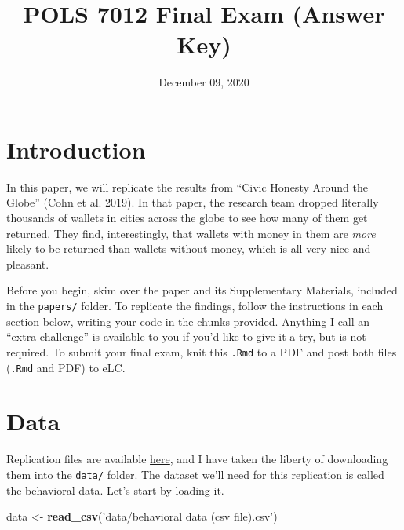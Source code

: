 \documentclass[12pt,halfline,a4paper,]{ouparticle}
\newenvironment{Shaded}{\begin{snugshade}}{\end{snugshade}}
\newcommand{\KeywordTok}[1]{\textcolor[rgb]{0.13,0.29,0.53}{\textbf{#1}}}
\newcommand{\NormalTok}[1]{#1}
\newcommand{\StringTok}[1]{\textcolor[rgb]{0.31,0.60,0.02}{#1}}
\begin{document}
\title{POLS 7012 Final Exam (Answer Key)}

\author{%
\address{University of Georgia}
\and
{}\address{University of Georgia}
}

\abstract{}

\date{December 09, 2020}

\keywords{}

\maketitle



\hypertarget{introduction}{%
\section{Introduction}\label{introduction}}

In this paper, we will replicate the results from ``Civic Honesty Around
the Globe'' (Cohn et al. 2019). In that paper, the research team dropped
literally thousands of wallets in cities across the globe to see how
many of them get returned. They find, interestingly, that wallets with
money in them are \emph{more} likely to be returned than wallets without
money, which is all very nice and pleasant.

Before you begin, skim over the paper and its Supplementary Materials,
included in the \texttt{papers/} folder. To replicate the findings,
follow the instructions in each section below, writing your code in the
chunks provided. Anything I call an ``extra challenge'' is available to
you if you'd like to give it a try, but is not required. To submit your
final exam, knit this \texttt{.Rmd} to a PDF and post both files
(\texttt{.Rmd} and PDF) to eLC.

\hypertarget{data}{%
\section{Data}\label{data}}

Replication files are available
\href{https://dataverse.harvard.edu/dataverse/honesty}{here}, and I have
taken the liberty of downloading them into the \texttt{data/} folder.
The dataset we'll need for this replication is called the behavioral
data. Let's start by loading it.

\begin{Shaded}
\begin{Highlighting}[]
\NormalTok{data <-}\StringTok{ }\KeywordTok{read_csv}\NormalTok{(}\StringTok{'data/behavioral data (csv file).csv'}\NormalTok{)}
\end{Highlighting}
\end{Shaded}
\end{document}

